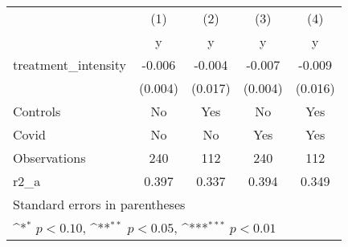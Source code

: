 {
\def\sym#1{\ifmmode^{#1}\else\(^{#1}\)\fi}
\begin{tabular}{l*{4}{c}}
\hline\hline
                    &\multicolumn{1}{c}{(1)}&\multicolumn{1}{c}{(2)}&\multicolumn{1}{c}{(3)}&\multicolumn{1}{c}{(4)}\\
                    &\multicolumn{1}{c}{y}&\multicolumn{1}{c}{y}&\multicolumn{1}{c}{y}&\multicolumn{1}{c}{y}\\
\hline
treatment\_intensity &      -0.006         &      -0.004         &      -0.007         &      -0.009         \\
                    &     (0.004)         &     (0.017)         &     (0.004)         &     (0.016)         \\
[1em]
Controls            &          No         &         Yes         &          No         &         Yes         \\
[1em]
Covid               &          No         &          No         &         Yes         &         Yes         \\
\hline
Observations        &         240         &         112         &         240         &         112         \\
r2\_a                &       0.397         &       0.337         &       0.394         &       0.349         \\
\hline\hline
\multicolumn{5}{l}{\footnotesize Standard errors in parentheses}\\
\multicolumn{5}{l}{\footnotesize \sym{*} \(p<0.10\), \sym{**} \(p<0.05\), \sym{***} \(p<0.01\)}\\
\end{tabular}
}

